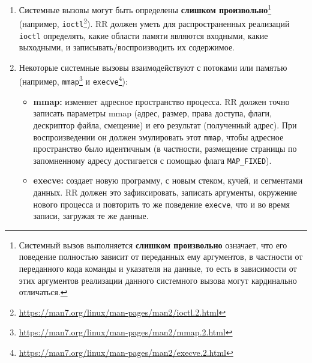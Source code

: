 \begin{enumerate}
  
  \item Системные вызовы могут быть определены \textbf{слишком
  произвольно}\footnote{Системный вызов выполняется \textbf{слишком
  произвольно} означает, что его поведение полностью зависит от переданных ему
  аргументов, в частности от переданного кода команды и указателя на данные, то
  есть в зависимости от этих аргументов реализации данного системного вызова
  могут кардинально отличаться.} (например,
  \texttt{ioctl}\footnote{\url{https://man7.org/linux/man-pages/man2/ioctl.2.html}}).
  RR должен уметь для распространенных реализаций \texttt{ioctl} определять,
  какие области памяти являются входными, какие выходными, и
  записывать/воспроизводить их содержимое.

  \item Некоторые системные вызовы взаимодействуют с потоками или памятью
  (например,
  \texttt{mmap}\footnote{\url{https://man7.org/linux/man-pages/man2/mmap.2.html}}
  и
  \texttt{execve}\footnote{\url{https://man7.org/linux/man-pages/man2/execve.2.html}}):
  
  \begin{itemize}

    \item \textbf{mmap:} изменяет адресное пространство процесса. RR должен
    точно записать параметры mmap (адрес, размер, права доступа, флаги,
    дескриптор файла, смещение) и его результат (полученный адрес). При
    воспроизведении он должен эмулировать этот \texttt{mmap}, чтобы адресное
    пространство было идентичным (в частности, размещение страницы по
    запомненному адресу достигается с помощью флага \texttt{MAP\_FIXED}).

    \item \textbf{execve:} создает новую программу, с новым стеком, кучей, и
    сегментами данных. RR должен это зафиксировать, записать аргументы,
    окружение нового процесса и повторить то же поведение \texttt{execve}, что
    и во время записи, загружая те же данные.

  \end{itemize}

\end{enumerate}


